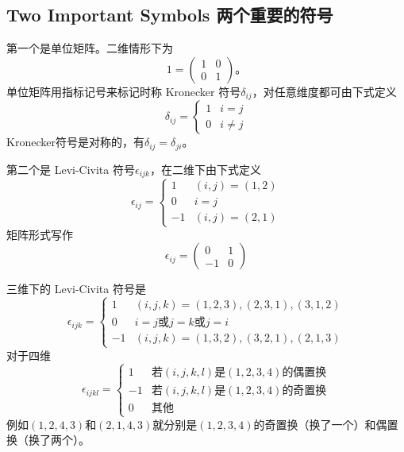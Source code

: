 \subsection[两个重要的符号]{Two Important Symbols 两个重要的符号}\label{appendix.B.5.5}
第一个是单位矩阵。二维情形下为
\begin{equation}
1= \begin{pmatrix}
1 & 0 \\ 0 & 1
\end{pmatrix}\text{。}
\end{equation}
单位矩阵用指标记号来标记时称 Kronecker 符号$\delta_{ij}$，对任意维度都可由下式定义
\begin{equation}
\delta_{ij} = \begin{cases}
1 & i=j \\
0 & i\ne j
\end{cases}
\end{equation}
Kronecker符号是对称的，有$\delta_{ij}=\delta_{ji}$。

第二个是 Levi-Civita 符号$\epsilon_{ijk}$，在二维下由下式定义
\begin{equation}
\epsilon_{ij} = \begin{cases}
1 & (i,j)={(1,2)} \\
0 & i=j \\
-1 & (i,j)={(2,1)}
\end{cases}
\end{equation}
矩阵形式写作
\begin{equation}
\epsilon_{ij} = \begin{pmatrix}
0 & 1 \\ -1 & 0
\end{pmatrix}
\end{equation}

三维下的 Levi-Civita 符号是
\begin{equation}
\epsilon_{ijk} = \begin{cases}
1 & (i,j,k)={(1,2,3),(2,3,1),(3,1,2)} \\
0 & i=j\text{或}j=k\text{或}j=i \\
-1 & (i,j,k)={(1,3,2),(3,2,1),(2,1,3)}
\end{cases}
\end{equation}
对于四维
\begin{equation}
\epsilon_{ijkl} = \begin{cases}
1 & \text{若}(i,j,k,l)\text{是}{(1,2,3,4)}\text{的偶置换} \\
-1 & \text{若}(i,j,k,l)\text{是}{(1,2,3,4)}\text{的奇置换}\\
0 & \text{其他}
\end{cases}
\end{equation}
例如$(1,2,4,3)$和$(2,1,4,3)$就分别是$(1,2,3,4)$的奇置换（换了一个）和偶置换（换了两个）。

